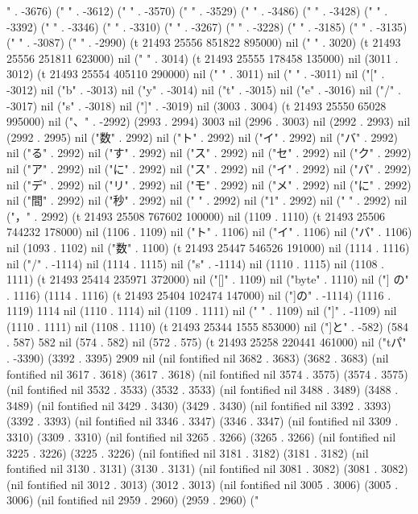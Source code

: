 " . -3676) ("
" . -3612) ("
" . -3570) ("
" . -3529) ("
" . -3486) ("
" . -3428) ("
" . -3392) ("
" . -3346) ("
" . -3310) ("
" . -3267) ("
" . -3228) ("
" . -3185) ("
" . -3135) ("
" . -3087) ("
" . -2990) (t 21493 25556 851822 895000) nil ("
" . 3020) (t 21493 25556 251811 623000) nil ("
" . 3014) (t 21493 25555 178458 135000) nil (3011 . 3012) (t 21493 25554 405110 290000) nil (" " . 3011) nil (" " . -3011) nil ("[" . -3012) nil ("b" . -3013) nil ("y" . -3014) nil ("t" . -3015) nil ("e" . -3016) nil ("/" . -3017) nil ("s" . -3018) nil ("]" . -3019) nil (3003 . 3004) (t 21493 25550 65028 995000) nil ("、" . -2992) (2993 . 2994) 3003 nil (2996 . 3003) nil (2992 . 2993) nil (2992 . 2995) nil ("数" . 2992) nil ("ト" . 2992) nil ("イ" . 2992) nil ("バ" . 2992) nil ("る" . 2992) nil ("す" . 2992) nil ("ス" . 2992) nil ("セ" . 2992) nil ("ク" . 2992) nil ("ア" . 2992) nil ("に" . 2992) nil ("ス" . 2992) nil ("イ" . 2992) nil ("バ" . 2992) nil ("デ" . 2992) nil ("リ" . 2992) nil ("モ" . 2992) nil ("メ" . 2992) nil ("に" . 2992) nil ("間" . 2992) nil ("秒" . 2992) nil (" " . 2992) nil ("1" . 2992) nil (" " . 2992) nil ("，" . 2992) (t 21493 25508 767602 100000) nil (1109 . 1110) (t 21493 25506 744232 178000) nil (1106 . 1109) nil ("ト" . 1106) nil ("イ" . 1106) nil ("バ" . 1106) nil (1093 . 1102) nil ("数" . 1100) (t 21493 25447 546526 191000) nil (1114 . 1116) nil ("/" . -1114) nil (1114 . 1115) nil ("s" . -1114) nil (1110 . 1115) nil (1108 . 1111) (t 21493 25414 235971 372000) nil ("[]" . 1109) nil ("byte" . 1110) nil ("] の" . 1116) (1114 . 1116) (t 21493 25404 102474 147000) nil ("]の" . -1114) (1116 . 1119) 1114 nil (1110 . 1114) nil (1109 . 1111) nil ("
" . 1109) nil ("]" . -1109) nil (1110 . 1111) nil (1108 . 1110) (t 21493 25344 1555 853000) nil ("]と" . -582) (584 . 587) 582 nil (574 . 582) nil (572 . 575) (t 21493 25258 220441 461000) nil ("tパ" . -3390) (3392 . 3395) 2909 nil (nil fontified nil 3682 . 3683) (3682 . 3683) (nil fontified nil 3617 . 3618) (3617 . 3618) (nil fontified nil 3574 . 3575) (3574 . 3575) (nil fontified nil 3532 . 3533) (3532 . 3533) (nil fontified nil 3488 . 3489) (3488 . 3489) (nil fontified nil 3429 . 3430) (3429 . 3430) (nil fontified nil 3392 . 3393) (3392 . 3393) (nil fontified nil 3346 . 3347) (3346 . 3347) (nil fontified nil 3309 . 3310) (3309 . 3310) (nil fontified nil 3265 . 3266) (3265 . 3266) (nil fontified nil 3225 . 3226) (3225 . 3226) (nil fontified nil 3181 . 3182) (3181 . 3182) (nil fontified nil 3130 . 3131) (3130 . 3131) (nil fontified nil 3081 . 3082) (3081 . 3082) (nil fontified nil 3012 . 3013) (3012 . 3013) (nil fontified nil 3005 . 3006) (3005 . 3006) (nil fontified nil 2959 . 2960) (2959 . 2960) ("
